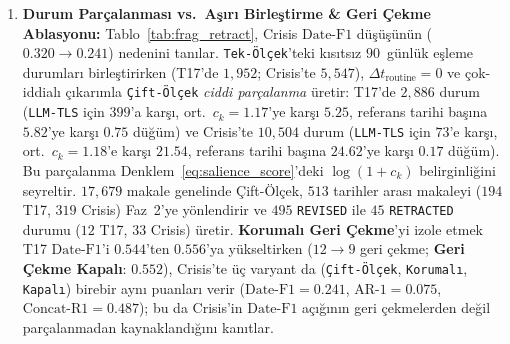 ﻿\documentclass[journal]{IEEEtran}
\begin{document}
\begin{enumerate}
    \item \textbf{Durum Par\c{c}alanmas{\i} vs.\ A\c{s}{\i}r{\i} Birle\c{s}tirme \& Geri \c{C}ekme Ablasyonu:} Tablo~\ref{tab:frag_retract}, Crisis $\text{Date-F1}$ d\"{u}\c{s}\"{u}\c{s}\"{u}n\"{u}n ($0.320 \to 0.241$) nedenini tan{\i}lar. \texttt{Tek-\"{O}l\c{c}ek}'teki k{\i}s{\i}ts{\i}z $90$~g\"{u}nl\"{u}k e\c{s}leme durumlar{\i} birle\c{s}tirirken (T17'de $1{,}952$; Crisis'te $5{,}547$), $\Delta t_{\text{routine}}=0$ ve \c{c}ok-iddial{\i} \c{c}{\i}kar{\i}mla \texttt{\c{C}ift-\"{O}l\c{c}ek} \textit{ciddi par\c{c}alanma} \"{u}retir: T17'de $2{,}886$ durum (\texttt{LLM-TLS} i\c{c}in $399$'a kar\c{s}{\i}, ort.\ $c_k = 1.17$'ye kar\c{s}{\i} $5.25$, referans tarihi ba\c{s}{\i}na $5.82$'ye kar\c{s}{\i} $0.75$ d\"{u}\u{g}\"{u}m) ve Crisis'te $10{,}504$ durum (\texttt{LLM-TLS} i\c{c}in $73$'e kar\c{s}{\i}, ort.\ $c_k = 1.18$'e kar\c{s}{\i} $21.54$, referans tarihi ba\c{s}{\i}na $24.62$'ye kar\c{s}{\i} $0.17$ d\"{u}\u{g}\"{u}m). Bu par\c{c}alanma Denklem~\eqref{eq:salience_score}'deki $\log(1+c_k)$ belirginli\u{g}ini seyreltir. $17{,}679$ makale genelinde \c{C}ift-\"{O}l\c{c}ek, $513$ tarihler aras{\i} makaleyi ($194$ T17, $319$ Crisis) Faz~2'ye y\"{o}nlendirir ve $495$ \texttt{REVISED} ile $45$ \texttt{RETRACTED} durumu ($12$ T17, $33$ Crisis) \"{u}retir. \textbf{Korumal{\i} Geri \c{C}ekme}'yi izole etmek T17 $\text{Date-F1}$'i $0.544$'ten $0.556$'ya y\"{u}kseltirken ($12 \to 9$ geri \c{c}ekme; \textbf{Geri \c{C}ekme Kapal{\i}}: $0.552$), Crisis'te \"{u}\c{c} varyant da (\texttt{\c{C}ift-\"{O}l\c{c}ek}, \texttt{Korumal{\i}}, \texttt{Kapal{\i}}) birebir ayn{\i} puanlar{\i} verir ($\text{Date-F1}=0.241$, $\text{AR-1}=0.075$, $\text{Concat-R1}=0.487$); bu da Crisis'in $\text{Date-F1}$ a\c{c}{\i}\u{g}{\i}n{\i}n geri \c{c}ekmelerden de\u{g}il par\c{c}alanmadan kaynakland{\i}\u{g}{\i}n{\i} kan{\i}tlar.

\end{enumerate}
\end{document}
